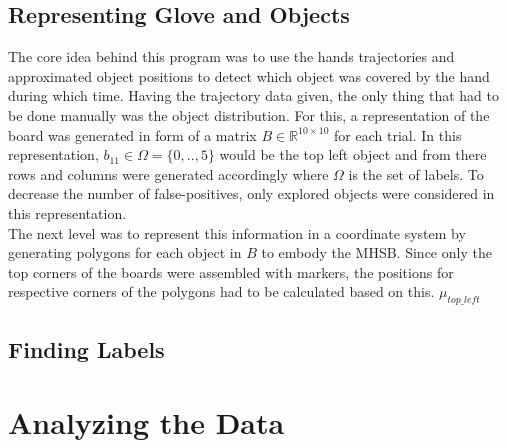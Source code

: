 \subsection{Representing Glove and Objects}
The core idea behind this program was to use the hands trajectories and approximated object positions to detect which object was covered by the hand during which time. Having the trajectory data given, the only thing that had to be done manually was the object distribution. For this, a representation of the board was generated in form of a matrix $B \in \mathbb{R}^{10 \times 10}$ for each trial. In this representation, $b_{11} \in \Omega=\{0,..,5\}$ would be the top left object and from there rows and columns were generated accordingly where $\Omega$ is the set of labels. To decrease the number of false-positives, only explored objects were considered in this representation.\\
The next level was to represent this information in a coordinate system by generating polygons for each object in $ B $ to embody the MHSB. Since only the top corners of the boards were assembled with markers, the positions for respective corners of the polygons had to be calculated based on this.   $ \mu_{top\_left} $

\subsection{Finding Labels}
\section{Analyzing the Data}